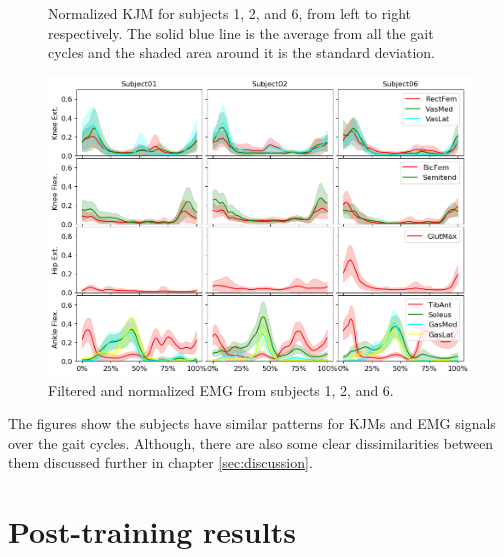 \documentclass[../main.tex]{subfiles}
\begin{document}
\begin{figure}
\begin{subfigure}[b]{0.325\textwidth}
     \end{subfigure}
    \caption{Normalized \ac{KJM} for subjects 1, 2, and 6, from left to right respectively. The solid blue line is the average from all the gait cycles and the shaded area around it is the standard deviation.}
    \label{fig:kjm-average}
\end{figure}
\begin{figure}
    \centering
    \includegraphics[width=\textwidth]{img/results/emg_avg/all_subject_grid_emg_avg.png}
    \caption{Filtered and normalized \ac{EMG} from subjects 1, 2, and 6.}
    \label{fig:emg-average}
\end{figure}
The figures show the subjects have similar patterns for \acp{KJM} and \ac{EMG} signals over the gait cycles.
Although, there are also some clear dissimilarities between them discussed further in chapter \ref{sec:discussion}.

\section{Post-training results}
\label{sec:post-training-results}
\end{document}
